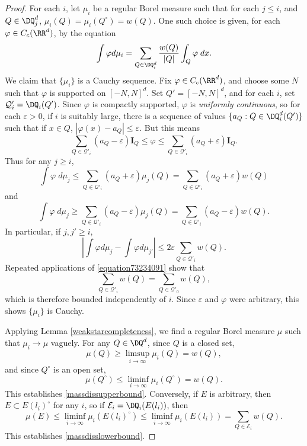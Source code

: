 \begin{proof}
	For each $i$, let $\mu_i$ be a regular Borel measure such that for each $j \leq i$, and $Q \in \DQ_j^d$, $\mu_i(Q) = \mu_i(Q^\circ) = w(Q)$. One such choice is given, for each $\varphi \in C_c(\RR^d)$, by the equation
	\[ \int \varphi d\mu_i = \sum_{Q \in \DQ_i^d} \frac{w(Q)}{|Q|} \int_Q \varphi\; dx. \]
	We claim that $\{ \mu_i \}$ is a Cauchy sequence. Fix $\varphi \in C_c(\RR^d)$, and choose some $N$ such that $\varphi$ is supported on $[-N,N]^d$. Set $Q' = [-N,N]^d$, and for each $i$, set $\mathcal{Q}'_i = \DQ_i(Q')$. Since $\varphi$ is compactly supported, $\varphi$ is \emph{uniformly continuous}, so for each $\varepsilon > 0$, if $i$ is suitably large, there is a sequence of values $\{ a_Q : Q \in \DQ_i^d(Q') \}$ such that if $x \in Q$, $|\varphi(x) - a_Q| \leq \varepsilon$. But this means
	\[ \sum_{Q \in \mathcal{Q}'_i} (a_Q - \varepsilon) \mathbf{I}_Q \leq \varphi \leq \sum_{Q \in \mathcal{Q}'_i} (a_Q + \varepsilon) \mathbf{I}_Q. \]
	Thus for any $j \geq i$,
	\[ \int \varphi\; d\mu_j\leq \sum_{Q \in \mathcal{Q}'_i} (a_Q + \varepsilon) \mu_j(Q) = \sum_{Q \in \mathcal{Q}'_i} (a_Q + \varepsilon) w(Q) \]
	and
	\[ \int \varphi\; d\mu_j \geq \sum_{Q \in \mathcal{Q}'_i} (a_Q - \varepsilon) \mu_j(Q) = \sum_{Q \in \mathcal{Q}'_i} (a_Q - \varepsilon) w(Q). \]
	In particular, if $j,j' \geq i$,
	\[ \left| \int \varphi d\mu_j - \int \varphi d\mu_{j'} \right| \leq 2 \varepsilon \sum_{Q \in \mathcal{Q}'_i} w(Q). \]
	Repeated applications of \eqref{equation73234091} show that
	\[ \sum_{Q \in \mathcal{Q}'_i} w(Q) = \sum_{Q \in \mathcal{Q}'_0} w(Q), \]
	which is therefore bounded independently of $i$. Since $\varepsilon$ and $\varphi$ were arbitrary, this shows $\{ \mu_i \}$ is Cauchy.

	Applying Lemma \ref{weakstarcompleteness}, we find a regular Borel measure $\mu$ such that $\mu_i \to \mu$ vaguely. For any $Q \in \DQ^d$, since $Q$ is a closed set,
	\[ \mu(Q) \geq \limsup_{i \to \infty} \mu_i(Q) = w(Q), \]
	and since $Q^\circ$ is an open set,
	\[ \mu(Q^\circ) \leq \liminf_{i \to \infty} \mu_i(Q^\circ) = w(Q). \]
	This establishes \eqref{massdissupperbound}. Conversely, if $E$ is arbitrary, then $E \subset E(l_i)^\circ$ for any $i$, so if $\mathcal{E}_i = \DQ_i(E(l_i))$, then
	\[ \mu(E) \leq \liminf_{i \to \infty} \mu_i(E(l_i)^\circ) \leq \liminf_{i \to \infty} \mu_i(E(l_i)) = \sum_{Q \in \mathcal{E}_i} w(Q). \]
	This establishes \eqref{massdisslowerbound}.
\end{proof}

